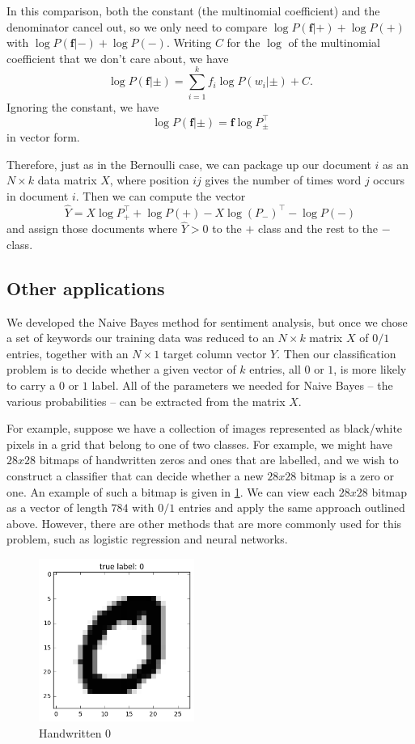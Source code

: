 \documentclass[
]{article}
\begin{document}
In this comparison, both the constant (the multinomial coefficient) and
the denominator cancel out, so we only need to compare
\(\log P(\mathbf{f}|+)+\log P(+)\) with
\(\log P(\mathbf{f}|-)+\log P(-)\). Writing \(C\) for the \(\log\) of
the multinomial coefficient that we don't care about, we have \[
\log P(\mathbf{f}|\pm) = \sum_{i=1}^{k} f_{i}\log P(w_{i}|\pm) + C.
\] Ignoring the constant, we have \[
\log P(\mathbf{f}|\pm) = \mathbf{f}\log P_{\pm}^{\intercal}
\] in vector form.

Therefore, just as in the Bernoulli case, we can package up our document
\(i\) as an \(N\times k\) data matrix \(X\), where position \(ij\) gives
the number of times word \(j\) occurs in document \(i\). Then we can
compute the vector \[
\hat{Y} = X\log P_{+}^{\intercal} + \log P(+)-X\log(P_{-})^{\intercal} - \log P(-)
\] and assign those documents where \(\hat{Y}>0\) to the \(+\) class and
the rest to the \(-\) class.

\hypertarget{other-applications}{%
\subsection{Other applications}\label{other-applications}}

We developed the Naive Bayes method for sentiment analysis, but once we
chose a set of keywords our training data was reduced to an
\(N\times k\) matrix \(X\) of \(0/1\) entries, together with an
\(N\times 1\) target column vector \(Y\). Then our classification
problem is to decide whether a given vector of \(k\) entries, all \(0\)
or \(1\), is more likely to carry a \(0\) or \(1\) label. All of the
parameters we needed for Naive Bayes -- the various probabilities -- can
be extracted from the matrix \(X\).

For example, suppose we have a collection of images represented as
black/white pixels in a grid that belong to one of two classes. For
example, we might have \(28x28\) bitmaps of handwritten zeros and ones
that are labelled, and we wish to construct a classifier that can decide
whether a new \(28x28\) bitmap is a zero or one. An example of such a
bitmap is given in \cref{fig:mnist0}. We can view each \(28x28\) bitmap
as a vector of length \(784\) with \(0/1\) entries and apply the same
approach outlined above. However, there are other methods that are more
commonly used for this problem, such as logistic regression and neural
networks.

\begin{figure}
\hypertarget{fig:mnist0}{%
\centering
\includegraphics[width=2in,height=\textheight]{../img/mnist_data_10_0.png}
\caption{Handwritten 0}\label{fig:mnist0}
}
\end{figure}
\end{document}
